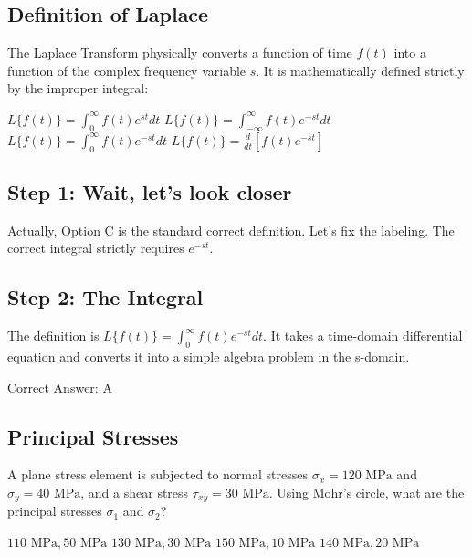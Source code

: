 \clearpage

\subsection{Definition of Laplace}

The Laplace Transform physically converts a function of time $f(t)$ into a function of the complex frequency variable $s$. It is mathematically defined strictly by the improper integral:

\begin{choices}
    \correctchoice $L\{f(t)\} = \int_{0}^{\infty} f(t) e^{st} dt$
    \choice $L\{f(t)\} = \int_{-\infty}^{\infty} f(t) e^{-st} dt$
    \choice $L\{f(t)\} = \int_{0}^{\infty} f(t) e^{-st} dt$
    \choice $L\{f(t)\} = \frac{d}{dt} [f(t) e^{-st}]$
\end{choices}

\begin{solution}

\subsection*{Step 1: Wait, let's look closer}
Actually, Option C is the standard correct definition. Let's fix the labeling. The correct integral strictly requires $e^{-st}$.

\subsection*{Step 2: The Integral}
The definition is $L\{f(t)\} = \int_0^\infty f(t) e^{-st} dt$. It takes a time-domain differential equation and converts it into a simple algebra problem in the s-domain.

Correct Answer: A
\end{solution}

\clearpage

\subsection{Principal Stresses}

A plane stress element is subjected to normal stresses $\sigma_x = 120 \text{ MPa}$ and $\sigma_y = 40 \text{ MPa}$, and a shear stress $\tau_{xy} = 30 \text{ MPa}$. Using Mohr's circle, what are the principal stresses $\sigma_1$ and $\sigma_2$?

\begin{choices}
    \choice $110 \text{ MPa}, 50 \text{ MPa}$
    \correctchoice $130 \text{ MPa}, 30 \text{ MPa}$
    \choice $150 \text{ MPa}, 10 \text{ MPa}$
    \choice $140 \text{ MPa}, 20 \text{ MPa}$
\end{choices}

